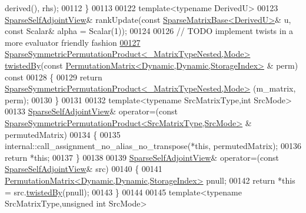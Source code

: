 \begin{DoxyCode}
      derived(), rhs);
00112     \}
00113 
00122     \textcolor{keyword}{template}<\textcolor{keyword}{typename} DerivedU>
00123     \hyperlink{group___sparse_core___module_class_eigen_1_1_sparse_self_adjoint_view}{SparseSelfAdjointView}& rankUpdate(\textcolor{keyword}{const} 
      \hyperlink{group___sparse_core___module_class_eigen_1_1_sparse_matrix_base}{SparseMatrixBase<DerivedU>}& u, \textcolor{keyword}{const} Scalar& alpha = Scalar(1));
00124     
00126     \textcolor{comment}{// TODO implement twists in a more evaluator friendly fashion}
\hyperlink{group___sparse_core___module_acde15b45cf7b43520e1005ec65d55f3c}{00127}     \hyperlink{class_eigen_1_1_sparse_symmetric_permutation_product}{SparseSymmetricPermutationProduct<\_MatrixTypeNested,Mode>}
       \hyperlink{group___sparse_core___module_acde15b45cf7b43520e1005ec65d55f3c}{twistedBy}(\textcolor{keyword}{const} \hyperlink{group___core___module}{PermutationMatrix<Dynamic,Dynamic,StorageIndex>}
      & perm)\textcolor{keyword}{ const}
00128 \textcolor{keyword}{    }\{
00129       \textcolor{keywordflow}{return} \hyperlink{class_eigen_1_1_sparse_symmetric_permutation_product}{SparseSymmetricPermutationProduct<\_MatrixTypeNested,Mode>}
      (m\_matrix, perm);
00130     \}
00131 
00132     \textcolor{keyword}{template}<\textcolor{keyword}{typename} SrcMatrixType,\textcolor{keywordtype}{int} SrcMode>
00133     \hyperlink{group___sparse_core___module_class_eigen_1_1_sparse_self_adjoint_view}{SparseSelfAdjointView}& operator=(\textcolor{keyword}{const} 
      \hyperlink{class_eigen_1_1_sparse_symmetric_permutation_product}{SparseSymmetricPermutationProduct<SrcMatrixType,SrcMode>}
      & permutedMatrix)
00134     \{
00135       internal::call\_assignment\_no\_alias\_no\_transpose(*\textcolor{keyword}{this}, permutedMatrix);
00136       \textcolor{keywordflow}{return} *\textcolor{keyword}{this};
00137     \}
00138 
00139     \hyperlink{group___sparse_core___module_class_eigen_1_1_sparse_self_adjoint_view}{SparseSelfAdjointView}& operator=(\textcolor{keyword}{const} 
      \hyperlink{group___sparse_core___module_class_eigen_1_1_sparse_self_adjoint_view}{SparseSelfAdjointView}& src)
00140     \{
00141       \hyperlink{group___core___module}{PermutationMatrix<Dynamic,Dynamic,StorageIndex>} pnull;
00142       \textcolor{keywordflow}{return} *\textcolor{keyword}{this} = src.\hyperlink{group___sparse_core___module_acde15b45cf7b43520e1005ec65d55f3c}{twistedBy}(pnull);
00143     \}
00144 
00145     \textcolor{keyword}{template}<\textcolor{keyword}{typename} SrcMatrixType,\textcolor{keywordtype}{unsigned} \textcolor{keywordtype}{int} SrcMode>

\end{DoxyCode}
